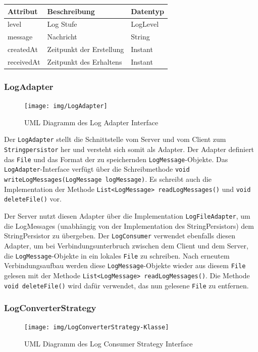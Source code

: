 \documentclass[12pt,a4paper,twosided]{scrartcl}
\begin{document}
\begin{tabular}{|l|l|l|}
	\hline \textbf{Attribut}   & \textbf{Beschreibung}             & \textbf{Datentyp} \\ \hline
	level      & Log Stufe                & LogLevel \\ \hline
	message    & Nachricht                & String   \\ \hline
	createdAt  & Zeitpunkt der Erstellung & Instant  \\ \hline
	receivedAt & Zeitpunkt des Erhaltens  & Instant  \\ \hline
\end{tabular}

\subsubsection{LogAdapter}
\begin{figure}[h]
	\centering
	\texttt{[image: img/LogAdapter]}
	\caption{UML Diagramm des Log Adapter Interface}
	\label{fig:logadapter}
\end{figure}


Der \texttt{LogAdapter} stellt die Schnittstelle vom Server und vom Client zum \texttt{Stringpersistor} her und versteht sich somit als Adapter.  Der Adapter definiert das \texttt{File} und das Format der zu speichernden \texttt{LogMessage}-Objekte. Das \texttt{LogAdapter}-Interface verfügt über die Schreibmethode \texttt{void writeLogMessages(LogMessage logMessage)}. Es schreibt auch die Implementation der Methode \texttt{List<LogMessage> readLogMessages()} und \texttt{void deleteFile()} vor.

Der Server nutzt diesen Adapter über die Implementation \texttt{LogFileAdapter}, um die LogMessages (unabhängig von der Implementation des StringPersistors) dem StringPersistor zu übergeben. Der \texttt{LogConsumer} verwendet ebenfalls diesen Adapter, um bei Verbindungsunterbruch zwischen dem Client und dem Server, die \texttt{LogMessage}-Objekte in ein lokales \texttt{File} zu schreiben. Nach erneutem Verbindungsaufbau werden diese \texttt{LogMessage}-Objekte wieder aus diesem \texttt{File} gelesen mit der Methode \texttt{List<LogMessage> readLogMessages()}. Die Methode \texttt{void deleteFile()} wird dafür verwendet, das nun gelesene \texttt{File} zu entfernen.

\subsubsection{LogConverterStrategy}
\begin{figure}[h]
	\centering
	\texttt{[image: img/LogConverterStrategy-Klasse]}
	\caption{UML Diagramm des Log Consumer Strategy Interface}
	\label{fig:logconverterstrategy-klasse}
\end{figure}
\end{document}
